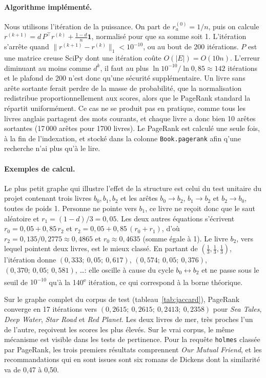 \documentclass[11pt,a4paper]{article}
\begin{document}
\paragraph{Algorithme implémenté.}
Nous utilisons l'itération de la puissance. On part de $r^{(0)}_a = 1/n$, puis on calcule $r^{(k+1)} = d\,P^{\top} r^{(k)} + \frac{1-d}{n}\mathbf{1}$, normalisé pour que sa somme soit 1. L'itération s'arrête quand $\lVert r^{(k+1)} - r^{(k)}\rVert_1 < 10^{-10}$, ou au bout de 200 itérations. $P$ est une matrice creuse SciPy dont une itération coûte $O(|E|) = O(10n)$. L'erreur diminuant au moins comme $d^k$, il faut au plus $\ln 10^{-10} / \ln 0{,}85 \approx 142$ itérations et le plafond de 200 n'est donc qu'une sécurité supplémentaire. Un livre sans arête sortante ferait perdre de la masse de probabilité, que la normalisation redistribue proportionnellement aux scores, alors que le PageRank standard la répartit uniformément. Ce cas ne se produit pas en pratique, comme tous les livres anglais partagent des mots courants, et chaque livre a donc bien 10 arêtes sortantes (17\,000 arêtes pour 1700 livres). Le PageRank est calculé une seule fois, à la fin de l'indexation, et stocké dans la colonne \texttt{Book.pagerank} afin q'une recherche n'ai plus qu'à le lire.

\paragraph{Exemples de calcul.}
Le plus petit graphe qui illustre l'effet de la structure est celui du test unitaire du projet contenant trois livres $b_0, b_1, b_2$ et les arêtes $b_0 \to b_2$, $b_1 \to b_2$ et $b_2 \to b_0$, toutes de poids 1. Personne ne pointe vers $b_1$, ce livre ne reçoit donc que le saut aléatoire et $r_1 = (1-d)/3 = 0{,}05$. Les deux autres équations s'écrivent $r_0 = 0{,}05 + 0{,}85\,r_2$ et $r_2 = 0{,}05 + 0{,}85\,(r_0 + r_1)$, d'où $r_2 = 0{,}135 / 0{,}2775 \approx 0{,}4865$ et $r_0 \approx 0{,}4635$ (somme égale à 1). Le livre $b_2$, vers lequel pointent deux livres, est le mieux classé. En partant de $(\tfrac13, \tfrac13, \tfrac13)$, l'itération donne $(0{,}333;\ 0{,}05;\ 0{,}617)$, $(0{,}574;\ 0{,}05;\ 0{,}376)$, $(0{,}370;\ 0{,}05;\ 0{,}581)$, \ldots : elle oscille à cause du cycle $b_0 \leftrightarrow b_2$ et ne passe sous le seuil de $10^{-10}$ qu'à la 140\textsuperscript{e} itération, ce qui correspond à la borne théorique.

Sur le graphe complet du corpus de test (tableau~\ref{tab:jaccard}), PageRank converge en 17 itérations vers $(0{,}2615;\ 0{,}2615;\ 0{,}2413;\ 0{,}2358)$ pour \emph{Sea Tales}, \emph{Deep Water}, \emph{Star Road} et \emph{Red Planet}. Les deux livres de mer, très proches l'un de l'autre, reçoivent les scores les plus élevés. Sur le vrai corpus, le même mécanisme est visible dans les tests de pertinence. Pour la requête \texttt{holmes} classée par PageRank, les trois premiers résultats comprennent \emph{Our Mutual Friend}, et les recommandations qui en sont issues sont six romans de Dickens dont la similarité va de 0,47 à 0,50.
\end{document}
